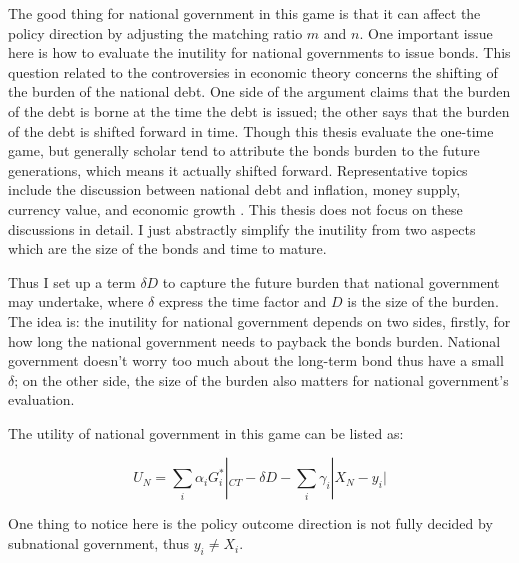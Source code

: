 \begin{itemize}
The good thing for national government in this game is that it can affect the policy direction by adjusting the matching ratio $m$ and $n$. One important issue here is how to evaluate the inutility for national governments to issue bonds. This question related to the controversies in economic theory concerns the shifting of the burden of the national debt. One side of the argument claims that the burden of the debt is borne at the time the debt is issued; the other says that the burden of the debt is shifted forward in time\cite{modigliani1961long,holcombe1981national}. Though this thesis evaluate the one-time game, but generally scholar tend to attribute the bonds burden to the future generations, which means it actually shifted forward. Representative topics include the discussion between national debt and inflation, money supply, currency value, and economic growth  \cite{cochrane2011inflation,aizenman2011using, hamburger1981deficits, panizza2014public, lucas1983optimal}. This thesis does not focus on these discussions in detail. I just abstractly simplify the inutility from two aspects which are the size of the bonds and time to mature\cite{diamond1965national, modigliani1961long, fullwiler2020interest}.

Thus I set up a term $\delta D$ to capture the future burden that national government may undertake, where $\delta$ express the time factor and $D$ is the size of the burden. The idea is: the inutility for national government depends on two sides, firstly, for how long the national government needs to payback the bonds burden. National government doesn't worry too much about the long-term bond thus have a small $\delta$; on the other side, the size of the burden also matters for national government's evaluation.

The utility of national government in this game can be listed as:

\begin{equation}
    U_N=\sum_i \alpha_iG_i^*|_{CT}-\delta D-\sum_i \gamma_i |X_N-y_i|
\end{equation}

One thing to notice here is the policy outcome direction is not fully decided by subnational government, thus $y_i\neq X_i$.


\end{itemize}

